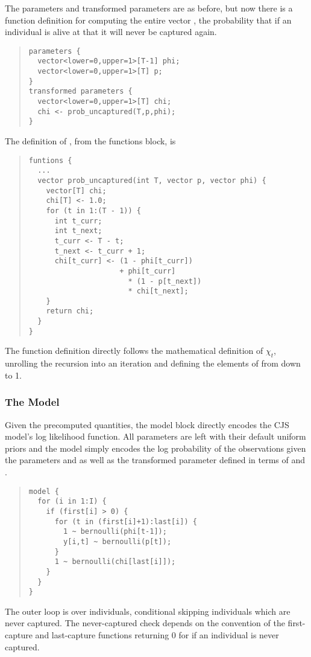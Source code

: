 The parameters and transformed parameters are as before, but now there
is a function definition for computing the entire vector , the
probability that if an individual is alive at  that it will
never be captured again.
%
\begin{quote}
\begin{Verbatim}
parameters {
  vector<lower=0,upper=1>[T-1] phi;
  vector<lower=0,upper=1>[T] p;
}
transformed parameters {
  vector<lower=0,upper=1>[T] chi;
  chi <- prob_uncaptured(T,p,phi);
}
\end{Verbatim}
\end{quote}
%
The definition of , from the functions block,
is
%
\begin{quote}
\begin{Verbatim}
funtions {
  ...
  vector prob_uncaptured(int T, vector p, vector phi) {
    vector[T] chi;
    chi[T] <- 1.0;              
    for (t in 1:(T - 1)) {
      int t_curr;
      int t_next;
      t_curr <- T - t;
      t_next <- t_curr + 1;
      chi[t_curr] <- (1 - phi[t_curr]) 
                     + phi[t_curr] 
                       * (1 - p[t_next]) 
                       * chi[t_next]; 
    }
    return chi;
  }
}
\end{Verbatim}
\end{quote}
%
The function definition directly follows the mathematical definition
of $\chi_t$, unrolling the recursion into an iteration and
defining the elements of  from  down to 1.

\subsubsection{The Model}

Given the precomputed quantities, the model block directly encodes the
CJS model's log likelihood function.  All parameters are left with
their default uniform priors and the model simply encodes the log
probability of the observations  given the parameters 
and  as well as the transformed parameter  defined
in terms of  and .
%
\begin{quote}
\begin{Verbatim}
model {
  for (i in 1:I) {
    if (first[i] > 0) {
      for (t in (first[i]+1):last[i]) {
        1 ~ bernoulli(phi[t-1]);
        y[i,t] ~ bernoulli(p[t]);
      }
      1 ~ bernoulli(chi[last[i]]);
    }
  }
}
\end{Verbatim}
\end{quote}
%
The outer loop is over individuals, conditional skipping individuals
 which are never captured.  The never-captured check depends
on the convention of the first-capture and last-capture functions
returning 0 for  if an individual is never captured.

